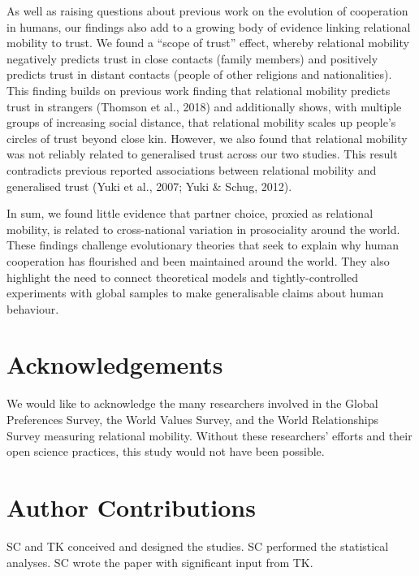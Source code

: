 \documentclass[
  man,floatsintext]{apa6}
\begin{document}
As well as raising questions about previous work on the evolution of cooperation in humans, our findings also add to a growing body of evidence linking relational mobility to trust. We found a ``scope of trust'' effect, whereby relational mobility negatively predicts trust in close contacts (family members) and positively predicts trust in distant contacts (people of other religions and nationalities). This finding builds on previous work finding that relational mobility predicts trust in strangers (Thomson et al., 2018) and additionally shows, with multiple groups of increasing social distance, that relational mobility scales up people's circles of trust beyond close kin. However, we also found that relational mobility was not reliably related to generalised trust across our two studies. This result contradicts previous reported associations between relational mobility and generalised trust (Yuki et al., 2007; Yuki \& Schug, 2012).

In sum, we found little evidence that partner choice, proxied as relational mobility, is related to cross-national variation in prosociality around the world. These findings challenge evolutionary theories that seek to explain why human cooperation has flourished and been maintained around the world. They also highlight the need to connect theoretical models and tightly-controlled experiments with global samples to make generalisable claims about human behaviour.

\newpage

\hypertarget{acknowledgements}{%
\section{Acknowledgements}\label{acknowledgements}}

We would like to acknowledge the many researchers involved in the Global Preferences Survey, the World Values Survey, and the World Relationships Survey measuring relational mobility. Without these researchers' efforts and their open science practices, this study would not have been possible.

\hypertarget{author-contributions}{%
\section{Author Contributions}\label{author-contributions}}

SC and TK conceived and designed the studies. SC performed the statistical analyses. SC wrote the paper with significant input from TK.
\end{document}
